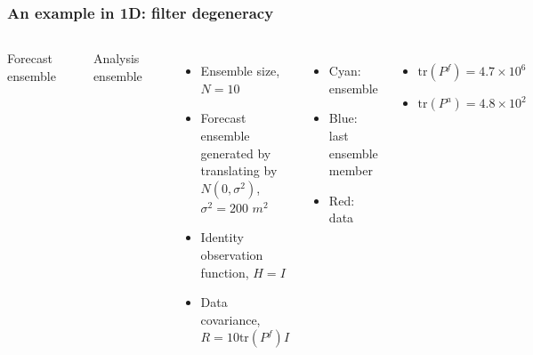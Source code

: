 \documentclass{beamer}
\begin{document}
\begin{frame}%
\frametitle{An example in 1D: filter degeneracy}%
\vspace{-.3in}
\begin{columns}%
%
\begin{center}Forecast ensemble\end{center}
\includegraphics[height=.9in]{eps/tprior}
\begin{center}Analysis ensemble\end{center}
\includegraphics[height=.9in]{eps/tenkfeye}
\vspace{.1in}
\begin{itemize}
\item
Ensemble size, $N=10$
\item
Forecast ensemble generated by translating by $N(0,\sigma^2)$, $\sigma^2=200$ $m^2$
\item
Identity observation function, $H=I$
\item
Data covariance, $R=10\mbox{tr}(P^f)I$
\end{itemize}
\vspace{.1in}
\begin{itemize}
\item
{\color{cyan}Cyan}: ensemble
\item
{\color{blue}Blue}: last ensemble member
\item
{\color{red}Red}: data
\end{itemize}
\vspace{.1in}
\begin{itemize}
\item
$\mbox{tr}(P^f)=4.7\times 10^6$
\item
$\mbox{tr}(P^a)=4.8\times 10^2$
\end{itemize}
\end{columns}
\end{frame}
\end{document}
